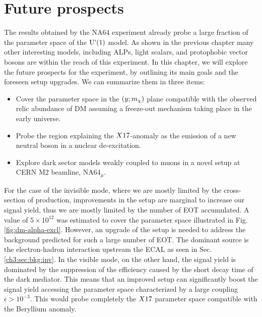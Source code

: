 
\newcommand{\pdirfive}{chapters/plots/chapter5}

\chapter{Future prospects} %
\label{chapter5} %

The results obtained by the NA64 experiment already probe a large fraction of the parameter space of the $\textrm{U'(1)}$ model. As shown in the previous chapter many other interesting models, including ALPs, light scalars, and protophobic vector bosons are within the reach of this experiment. In this chapter, we will explore the future prospects for the experiment, by outlining its main goals and the foreseen setup upgrades. We can summarize them in three items:

\begin{itemize}
\item Cover the parameter space in the $(y;m_{\chi})$ plane compatible with the observed relic abundance of DM assuming a freeze-out mechanism taking place in the early universe.
\item Probe the region explaining the $X17$-anomaly as the emission of a new neutral boson in a nuclear de-excitation.
\item Explore dark sector models weakly coupled to muons in a novel setup at CERN M2 beamline, NA64$_{\mu}$.
\end{itemize}

For the case of the invisible mode, where we are mostly limited by the cross-section of production, improvements in the setup are marginal to increase our signal yield, thus we are mostly limited by the number of EOT accumulated. 
A value of $5 \times 10^{12}$ was estimated to cover the parameter space illustrated in Fig.\ref{fig:dm-alpha-excl}. However, an upgrade of the setup is needed to address the background predicted for such a large number of EOT. The dominant source is the electron-hadron interaction upstream the ECAL as seen in Sec.\ref{ch3:sec:bkg:inv}.
In the visible mode, on the other hand, the signal yield is dominated by the suppression of the efficiency caused by the short decay time of the dark mediator. This means that an improved setup can significantly boost the signal yield accessing the parameter space characterized by a large coupling $\epsilon > 10^{-3}$. This would probe completely the $X17$ parameter space compatible with the Beryllium anomaly.

